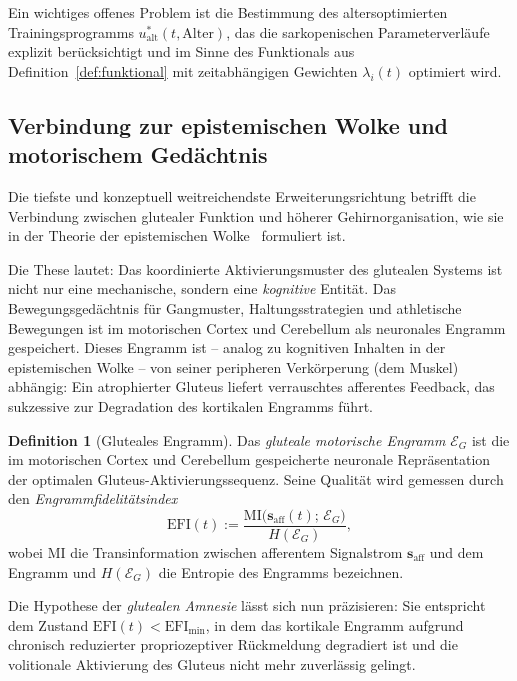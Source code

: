 ﻿\documentclass[12pt,a4paper]{report}
\theoremstyle{plain}
\theoremstyle{definition}
\newtheorem{definition}[theorem]{Definition}
\theoremstyle{remark}
\begin{document}
	Ein wichtiges offenes Problem ist die Bestimmung des altersoptimierten
	Trainingsprogramms $u^*_{\mathrm{alt}}(t, \mathrm{Alter})$, das die
	sarkopenischen Parameterverläufe explizit berücksichtigt und im Sinne
	des Funktionals aus Definition~\ref{def:funktional} mit
	zeitabhängigen Gewichten $\lambda_i(t)$ optimiert wird.
	
	\subsection{Verbindung zur epistemischen Wolke und motorischem Gedächtnis}
	\label{subsec:wolke}
	
	Die tiefste und konzeptuell weitreichendste Erweiterungsrichtung betrifft
	die Verbindung zwischen glutealer Funktion und höherer Gehirnorganisation,
	wie sie in der Theorie der epistemischen Wolke~\cite{epp2026wolke} formuliert ist.
	
	Die These lautet: Das koordinierte Aktivierungsmuster des glutealen Systems
	ist nicht nur eine mechanische, sondern eine \emph{kognitive} Entität.
	Das Bewegungsgedächtnis für Gangmuster, Haltungsstrategien und
	athletische Bewegungen ist im motorischen Cortex und Cerebellum als
	neuronales Engramm gespeichert. Dieses Engramm ist -- analog zu
	kognitiven Inhalten in der epistemischen Wolke -- von seiner
	peripheren Verkörperung (dem Muskel) abhängig: Ein atrophierter Gluteus
	liefert verrauschtes afferentes Feedback, das sukzessive zur Degradation
	des kortikalen Engramms führt.
	
	\begin{definition}[Gluteales Engramm]
		\label{def:engramm}
		Das \emph{gluteale motorische Engramm} $\mathcal{E}_G$ ist die im
		motorischen Cortex und Cerebellum gespeicherte neuronale Repräsentation
		der optimalen Gluteus-Aktivierungssequenz. Seine Qualität wird gemessen durch
		den \emph{Engrammfidelitätsindex}
		\[
		\mathrm{EFI}(t) := \frac{\mathrm{MI}\bigl(\mathbf{s}_{\mathrm{aff}}(t);\,
			\mathcal{E}_G\bigr)}{H(\mathcal{E}_G)},
		\]
		wobei $\mathrm{MI}$ die Transinformation zwischen afferentem Signalstrom
		$\mathbf{s}_{\mathrm{aff}}$ und dem Engramm und $H(\mathcal{E}_G)$
		die Entropie des Engramms bezeichnen.
	\end{definition}
	
	Die Hypothese der \emph{glutealen Amnesie} lässt sich nun präzisieren:
	Sie entspricht dem Zustand $\mathrm{EFI}(t) < \mathrm{EFI}_{\min}$,
	in dem das kortikale Engramm aufgrund chronisch reduzierter
	propriozeptiver Rückmeldung degradiert ist und die volitionale
	Aktivierung des Gluteus nicht mehr zuverlässig gelingt.
	
\end{document}
